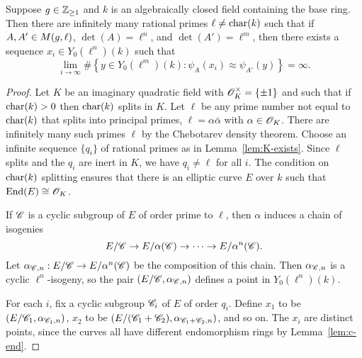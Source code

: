 \documentclass{amsart}
\begin{document}
\begin{proposition}\label{prop:lim-degree}
Suppose $g\in\mathbb{Z}_{\ge 1}$ and $k$ is an algebraically closed field containing the base ring.
  Then there are infinitely many rational primes $\ell\neq\operatorname{char}(k)$ such that if 
   $A,A' \in M(g,\ell)$, $\det(A) = \ell^n$, and $\det(A') = \ell^m$,
  then there exists a sequence $x_i \in Y_0(\ell^n)(k)$ such that
  \[
    \lim_{i \to \infty}\#\left\{ y \in Y_0(\ell^m)(k) \colon \psi_A(x_i) \approx \psi_{A'}(y) \right\} = \infty.
  \]
\end{proposition}
\begin{proof}
  Let $K$ be an imaginary quadratic field %
with $\mathscr{O}_K^\times = \{\pm 1\}$ and such that if $\operatorname{char}(k) > 0$ then $\operatorname{char}(k)$ splits in $K$.
Let $\ell$ be any prime number not equal to $\operatorname{char}(k)$ that splits into principal primes, $\ell = \alpha{\bar \alpha}$ with $ \alpha\in \mathscr{O}_K$.
There are infinitely many such primes $\ell$ by the Chebotarev density theorem.
Choose an infinite sequence $\{q_i\}$ of rational primes as in Lemma~\ref{lem:K-exists}. Since $\ell$ splits and the $q_i$ are
inert in $K$, we have $q_i\ne \ell$ for all $i$. %
The condition on $\operatorname{char}(k)$ splitting ensures that there is an elliptic curve $E$ over $k$ such that $\operatorname{End}(E) \cong \mathscr{O}_K$.

  If $\mathscr{C}$ is a cyclic subgroup of $E$ of order prime to $\ell$, then $\alpha$ induces a chain of isogenies
  \[
    E/\mathscr{C} \to E/\alpha(\mathscr{C}) \to \cdots \to E/\alpha^n(\mathscr{C}).
  \]
  Let $\alpha_{\mathscr{C},n}: E/\mathscr{C} \to E/\alpha^n(\mathscr{C})$ be the composition of this chain. Then $\alpha_{\mathscr{C},n}$ is a cyclic $\ell^n$-isogeny, so the pair $(E/\mathscr{C},\alpha_{\mathscr{C},n})$ defines a point in $Y_0(\ell^n)(k)$.

    For each $i$, fix a cyclic subgroup $\mathscr{C}_i$ of $E$ of order $q_i$. Define $x_1$ to be $(E/\mathscr{C}_1,\alpha_{\mathscr{C}_1,n})$, $x_2$ to be $(E/(\mathscr{C}_1 + \mathscr{C}_2), \alpha_{\mathscr{C}_1 + \mathscr{C}_2,n})$, and so on. The $x_i$ are distinct points, since the curves all have different endomorphism rings by Lemma~\ref{lem:c-end}.


\end{proof}
\end{document}
